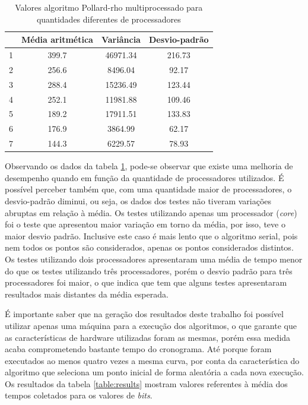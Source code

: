 \begin{table}[h]
\centering
\begin{tabular}{|l|c|c|c|}
\hline
\rowcolor[gray]{0.9}
\multicolumn{1}{|c|}{\textbf{Cores}} & \textbf{Média aritmética}  & \textbf{Variância} & \textbf{Desvio-padrão} \\ \hline
1                                    & 399.7                      & 46971.34           & 216.73                 \\ \hline
2                                    & 256.6                      & 8496.04            & 92.17                  \\ \hline
3                                    & 288.4                      & 15236.49           & 123.44                 \\ \hline
4                                    & 252.1                      & 11981.88           & 109.46                 \\ \hline
5                                    & 189.2                      & 17911.51           & 133.83                 \\ \hline
6                                    & 176.9                      & 3864.99            &  62.17                 \\ \hline
7                                    & 144.3                      & 6229.57            &  78.93                 \\ \hline
\end{tabular}
\caption{Valores algoritmo Pollard-rho multiprocessado para quantidades diferentes de processadores}
\label{table:estatistica_mproc}
\end{table}

Observando os dados da tabela \ref{table:estatistica_mproc}, pode-se observar que existe uma melhoria de desempenho quando em função da quantidade de processadores utilizados. É possível perceber também que, com uma quantidade maior de processadores, o desvio-padrão diminui, ou seja, os dados dos testes não tiveram variações abruptas em relação à média. Os testes utilizando apenas um processador (\textit{core}) foi o teste que apresentou maior variação em torno da média, por isso, teve o maior desvio padrão. Inclusive este caso é mais lento que o algoritmo serial, pois nem todos os pontos são considerados, apenas os pontos considerados distintos. Os testes utilizando dois processadores apresentaram uma média de tempo menor do que os testes utilizando três processadores, porém o desvio padrão para três processadores foi maior, o que indica que tem que alguns testes apresentaram resultados mais distantes da média esperada.

É importante saber que na geração dos resultados deste trabalho foi possível utilizar apenas uma máquina para a execução dos algoritmos, o que garante que as características de hardware utilizadas foram as mesmas, porém essa medida acaba comprometendo bastante tempo do cronograma. Até porque foram executados ao menos quatro vezes a mesma curva, por conta da característica do algoritmo que seleciona um ponto inicial de forma aleatória a cada nova execução. Os resultados da tabela \ref{table:results} mostram valores referentes à média dos tempos coletados para os valores de \textit{bits}.
